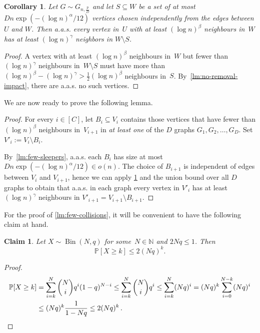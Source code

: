 \documentclass[a4paper,11pt]{article}
\makeatletter
\theoremstyle{definition}
\theoremstyle{plain}
\newtheorem{corollary}{Corollary}
\newtheorem{claim}{Claim}
\newcommand{\NN}{\ensuremath{\mathbb{N}}}
\newcommand{\prob}{\mathbb{P}}
\newcommand{\aas}{a.a.s.\@\xspace}
\makeatother
\begin{document}
\begin{corollary}
	\label{lm:no-removal-cascade}
	Let $G \sim G_{n, \frac{p}{D}}$ and let $S \subseteq W$ be a set of at most
	$Dn \exp\left(-(\log n)^\alpha/12\right)$ vertices
	chosen independently from the edges between $U$ and $W$.
	Then \aas every vertex in~$U$ with at least $(\log n)^\beta$ neighbours in~$W$
	has at least $(\log n)^\gamma$ neighbors in $W \setminus S$.
\end{corollary}
\begin{proof}
	A vertex with at least $(\log n)^\beta$ neighbours in~$W$
	but fewer than $(\log n)^\gamma$ neighbours in~$W \setminus S$
	must have more than $(\log n)^\beta - (\log n)^\gamma > \frac{1}{2}(\log n)^\beta$ neighbours in~$S$.
	By~\cref{lm:no-removal-impact},
	there are \aas no such vertices.
\end{proof}

We are now ready to prove the following lemma.

\multiEpochExpectedNeighbours*
\begin{proof}
	For every $i \in [C]$, let $B_i \subseteq V_i$ contains those vertices that have fewer than $(\log n)^\beta$ neighbours in~$V_{i+1}$ in \emph{at least one} of the $D$ graphs $G_1, G_2, \ldots, G_D$. Set $V'_i:=V_i\setminus B_i$.
	
	By~\cref{lm:few-sleepers}, \aas
	each $B_i$ has size at most $D n \exp\left(-(\log n)^\alpha/12\right)  \in o(n)$.
	The choice of $B_{i+1}$ is independent of edges between $V_{i}$ and $V_{i+1}$,
	hence we can apply \cref{lm:no-removal-cascade} and the union bound
	over all $D$ graphs to obtain
	that \aas in each graph every vertex in $V'_i$ has at least
	$(\log n)^\gamma$ neighbours in $V'_{i+1} = V_{i+1} \setminus B_{i+1}$.
\end{proof}

For the proof of \cref{lm:few-collisions}, it will be convenient to have the following claim at hand.

\begin{claim}
	\label{lm:binomial-bound}
	Let $X \sim \operatorname{Bin}(N, q)$ for some~$N \in \NN$ and $2Nq \leq 1$.
	Then 
	\[
	\prob[X \geq k] \leq  2 (Nq)^k .
	\]
\end{claim}
\begin{proof}
	\begin{align*}
		\prob[X \geq k] &= \sum_{i=k}^N \binom{N}{i} q^i (1-q)^{N-i}
		\leq \sum_{i=k}^N \binom{N}{i} q^i
		\leq \sum_{i=k}^N (Nq)^i
		= (Nq)^k \sum_{i=0}^{N-k} (Nq)^i
		\\ &\leq (Nq)^k \frac{1}{1-Nq}
		\leq 2(Nq)^k \,.\qedhere
	\end{align*}
\end{proof}
\end{document}
